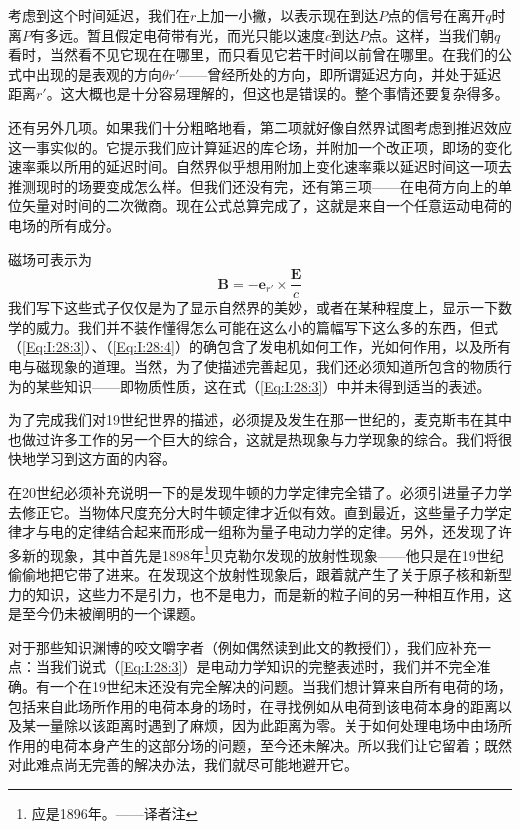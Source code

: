 考虑到这个时间延迟，我们在$r$上加一小撇，以表示现在到达$P$点的信号在离开$q$时离$P$有多远。暂且假定电荷带有光，而光只能以速度$c$到达$P$点。这样，当我们朝$q$看时，当然看不见它现在在哪里，而只看见它若干时间以前曾在哪里。在我们的公式中出现的是表观的方向$\theta r'$——曾经所处的方向，即所谓延迟方向，并处于延迟距离$r'$。这大概也是十分容易理解的，但这也是错误的。整个事情还要复杂得多。

还有另外几项。如果我们十分粗略地看，第二项就好像自然界试图考虑到推迟效应这一事实似的。它提示我们应计算延迟的库仑场，并附加一个改正项，即场的变化速率乘以所用的延迟时间。自然界似乎想用附加上变化速率乘以延迟时间这一项去推测现时的场要变成怎么样。但我们还没有完，还有第三项——在电荷方向上的单位矢量对时间的二次微商。现在公式总算完成了，这就是来自一个任意运动电荷的电场的所有成分。

磁场可表示为
\begin{equation}
    \label{Eq:I:28:4}
    \boldsymbol{B} = -\boldsymbol{e}_{r'} \times \frac{\boldsymbol{E}}{c}
\end{equation}
我们写下这些式子仅仅是为了显示自然界的美妙，或者在某种程度上，显示一下数学的威力。我们并不装作懂得怎么可能在这么小的篇幅写下这么多的东西，但式（\ref{Eq:I:28:3}）、（\ref{Eq:I:28:4}）的确包含了发电机如何工作，光如何作用，以及所有电与磁现象的道理。当然，为了使描述完善起见，我们还必须知道所包含的物质行为的某些知识——即物质性质，这在式（\ref{Eq:I:28:3}）中并未得到适当的表述。

为了完成我们对19世纪世界的描述，必须提及发生在那一世纪的，麦克斯韦在其中也做过许多工作的另一个巨大的综合，这就是热现象与力学现象的综合。我们将很快地学习到这方面的内容。

在20世纪必须补充说明一下的是发现牛顿的力学定律完全错了。必须引进量子力学去修正它。当物体尺度充分大时牛顿定律才近似有效。直到最近，这些量子力学定律才与电的定律结合起来而形成一组称为量子电动力学的定律。另外，还发现了许多新的现象，其中首先是1898年\footnote{应是1896年。——译者注}贝克勒尔发现的放射性现象——他只是在19世纪偷偷地把它带了进来。在发现这个放射性现象后，跟着就产生了关于原子核和新型力的知识，这些力不是引力，也不是电力，而是新的粒子间的另一种相互作用，这是至今仍未被阐明的一个课题。

对于那些知识渊博的咬文嚼字者（例如偶然读到此文的教授们），我们应补充一点：当我们说式（\ref{Eq:I:28:3}）是电动力学知识的完整表述时，我们并不完全准确。有一个在19世纪末还没有完全解决的问题。当我们想计算来自所有电荷的场，包括来自此场所作用的电荷本身的场时，在寻找例如从电荷到该电荷本身的距离以及某一量除以该距离时遇到了麻烦，因为此距离为零。关于如何处理电场中由场所作用的电荷本身产生的这部分场的问题，至今还未解决。所以我们让它留着；既然对此难点尚无完善的解决办法，我们就尽可能地避开它。


